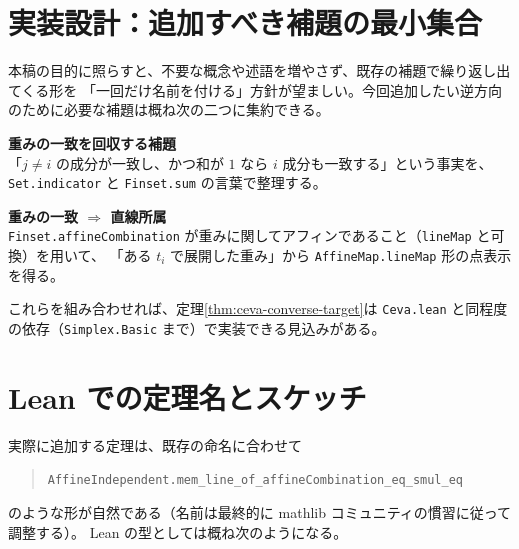 \documentclass[a4paper,12pt]{bxjsbook}
\newlength{\customindent}
\newenvironment{body}{
  \par
  \begingroup
  \setlength{\leftskip}{\customindent}
  \setlength{\rightskip}{0pt}
  \setlength{\parindent}{1em}
  \setlength{\displayindent}{\customindent}
  \setlength{\displaywidth}{\dimexpr\linewidth-\customindent\relax}
}{
  \par
  \endgroup
}
\theoremstyle{theorem}
\begin{document}
    \section{実装設計：追加すべき補題の最小集合}\label{sec:design}
    \begin{body}
        \indent 本稿の目的に照らすと、不要な概念や述語を増やさず、既存の補題で繰り返し出てくる形を
        「一回だけ名前を付ける」方針が望ましい。今回追加したい逆方向のために必要な補題は概ね次の二つに集約できる。
        \begin{bodyenumerate}
            \item \textbf{重みの一致を回収する補題}\\
            「$j\neq i$ の成分が一致し、かつ和が $1$ なら $i$ 成分も一致する」という事実を、
            \texttt{Set.indicator} と \texttt{Finset.sum} の言葉で整理する。
            \item \textbf{重みの一致 $\Rightarrow$ 直線所属}\\
            \texttt{Finset.affineCombination} が重みに関してアフィンであること（\texttt{lineMap} と可換）を用いて、
            「ある $t_i$ で展開した重み」から \texttt{AffineMap.lineMap} 形の点表示を得る。
        \end{bodyenumerate}

        \indent これらを組み合わせれば、定理\ref{thm:ceva-converse-target}は
        \texttt{Ceva.lean} と同程度の依存（\texttt{Simplex.Basic} まで）で実装できる見込みがある。
    \end{body}

    \section{Lean での定理名とスケッチ}\label{sec:lean-sketch}
    \begin{body}
        \indent 実際に追加する定理は、既存の命名に合わせて
        \begin{quote}
            \texttt{AffineIndependent.mem\_line\_of\_affineCombination\_eq\_smul\_eq}
        \end{quote}
        のような形が自然である（名前は最終的に mathlib コミュニティの慣習に従って調整する）。
        Lean の型としては概ね次のようになる。
    \end{body}
\end{document}
